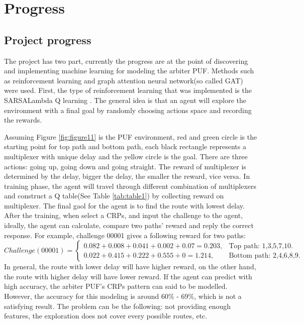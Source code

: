 \chapter{Progress}

\section{Project progress}
The project has two part, currently the progress are at the point of discovering and implementing machine learning for modeling the arbiter PUF. Methods such as reinforcement learning
and graph attention neural network(so called GAT) were used. First, the type of reinforcement learning that was implemented is the SARSALambda Q learning \cite{Reference9}. The general idea is that an agent will 
explore the environment with a final goal by randomly choosing actions space and recording the rewards. 

Assuming Figure \ref{fig:figure11} is the PUF environment, red and green circle is the starting point for top path and bottom path, each black rectangle represents a multiplexer with unique delay and the yellow 
circle is the goal. There are three actions: going up, going down and going straight. The reward of multiplexer is determined by the delay, bigger the delay, the smaller the reward, vice versa. In training phase, 
the agent will travel through different combination of multiplexers and construct a Q table(See Table \ref{tab:table1}) by collecting reward on multiplexer. The final gaol for the agent is to find the route with 
lowest delay. After the training, when select a CRPs, and input the challenge to the agent, ideally, the agent can calculate, compare two paths' reward and reply the correct response. For example, challenge 00001
gives a following reward for two paths:
\begin{equation}
    Challenge(00001) =\begin{cases}
    0.082+0.008+0.041+0.002+0.07 = 0.203, & \text {Top path: 1,3,5,7,10}.\\
    0.022+0.415+0.222+0.555+0 = 1.214, & \text {Bottom path: 2,4,6,8,9}.
    \end{cases}
\end{equation}
In general, the route with lower delay will have higher reward, on the other hand, the route with higher delay will have lower reward. If the agent can predict with high accuracy, the arbiter PUF's CRPs pattern can said to 
be modelled. However, the accuracy for this modeling is around 60\% - 69\%, which is not a satisfying result. The problem can be the following: not providing enough features, the exploration does not cover every 
possible routes, etc.


